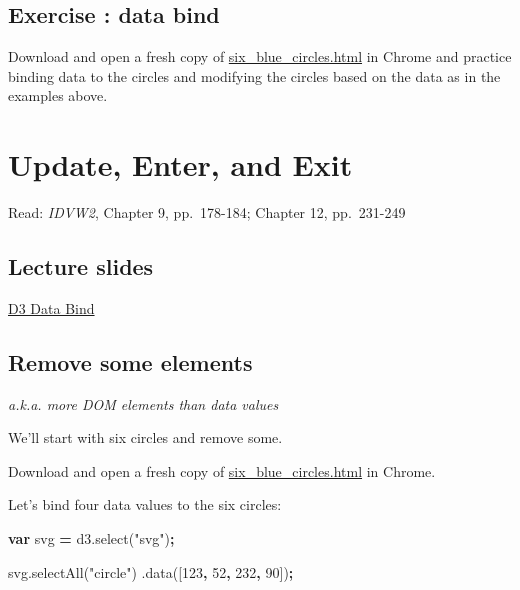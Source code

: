 \documentclass[openany]{book}
\newenvironment{Shaded}{\begin{snugshade}}{\end{snugshade}}
\newcommand{\AttributeTok}[1]{\textcolor[rgb]{0.77,0.63,0.00}{#1}}
\newcommand{\DecValTok}[1]{\textcolor[rgb]{0.00,0.00,0.81}{#1}}
\newcommand{\KeywordTok}[1]{\textcolor[rgb]{0.13,0.29,0.53}{\textbf{#1}}}
\newcommand{\NormalTok}[1]{#1}
\newcommand{\OperatorTok}[1]{\textcolor[rgb]{0.81,0.36,0.00}{\textbf{#1}}}
\newcommand{\StringTok}[1]{\textcolor[rgb]{0.31,0.60,0.02}{#1}}
\newcommand{\VariableTok}[1]{\textcolor[rgb]{0.00,0.00,0.00}{#1}}
\begin{document}
\hypertarget{exercise-data-bind}{%
\section{Exercise : data bind}\label{exercise-data-bind}}

Download and open a fresh copy of \href{https://raw.githubusercontent.com/jtr13/d3book/master/code/six_blue_circles.html}{six\_blue\_circles.html} in Chrome and practice binding data to the circles and modifying the circles based on the data as in the examples above.

\hypertarget{update-enter-and-exit}{%
\chapter{Update, Enter, and Exit }\label{update-enter-and-exit}}

Read: \emph{IDVW2}, Chapter 9, pp.~178-184; Chapter 12, pp.~231-249

\hypertarget{lecture-slides}{%
\section{Lecture slides }\label{lecture-slides}}

\href{https://github.com/jtr13/D3/blob/master/UpdateEnterExit.pdf}{D3 Data Bind}

\hypertarget{remove-some-elements}{%
\section{Remove some elements }\label{remove-some-elements}}

\emph{a.k.a. more DOM elements than data values}

We'll start with six circles and remove some.

Download and open a fresh copy of \href{https://raw.githubusercontent.com/jtr13/d3book/master/code/six_blue_circles.html}{six\_blue\_circles.html} in Chrome.

Let's bind four data values to the six circles:

\begin{Shaded}
\begin{Highlighting}[]
\KeywordTok{var}\NormalTok{ svg }\OperatorTok{=} \VariableTok{d3}\NormalTok{.}\AttributeTok{select}\NormalTok{(}\StringTok{"svg"}\NormalTok{)}\OperatorTok{;}

\VariableTok{svg}\NormalTok{.}\AttributeTok{selectAll}\NormalTok{(}\StringTok{"circle"}\NormalTok{)}
\NormalTok{    .}\AttributeTok{data}\NormalTok{([}\DecValTok{123}\OperatorTok{,} \DecValTok{52}\OperatorTok{,} \DecValTok{232}\OperatorTok{,} \DecValTok{90}\NormalTok{])}\OperatorTok{;}
\end{Highlighting}
\end{Shaded}
\end{document}
